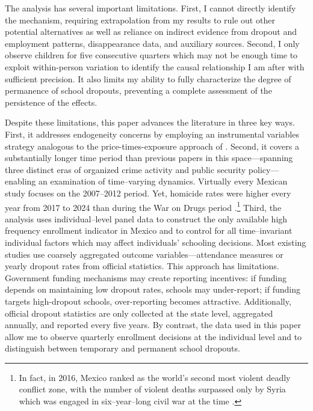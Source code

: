 \documentclass[12pt,letter,english,intoc,bibliography=totoc,index=totoc,BCOR10mm,captions=tableheading,nottitlepage,fleqn]{article}
\theoremstyle{break}
\begin{document}
The analysis has several important limitations. First, I cannot directly identify the mechanism, requiring extrapolation from my results to rule out other potential alternatives as well as reliance on indirect evidence from dropout and employment patterns, disappearance data, and auxiliary sources. Second, I only observe children for five consecutive quarters which may not be enough time to exploit within-person variation to identify the causal relationship I am after with sufficient precision. It also limits my ability to fully characterize the degree of permanence of school dropouts, preventing a complete assessment of the persistence of the effects.  

Despite these limitations, this paper advances the literature in three key ways. First, it addresses endogeneity concerns by employing an instrumental variables strategy analogous to the price-times-exposure approach of \citet{dubevargas}. Second, it covers a substantially longer time period than previous papers in this space---spanning three distinct eras of organized crime activity and public security policy---enabling an examination of time--varying dynamics. Virtually every Mexican study focuses on the 2007--2012 period. Yet, homicide rates were higher every year from 2017 to 2024 than during the War on Drugs period \citep{igarape}.\footnote{In fact, in 2016, Mexico ranked as the world's second most violent deadly conflict zone, with the number of violent deaths surpassed only by Syria which was engaged in six--year--long civil war at the time \citep{iiss2017}.} Third, the analysis uses individual--level panel data to construct the only available high frequency enrollment indicator in Mexico and to control for all time--invariant individual factors which may affect individuals' schooling decisions. Most existing studies use coarsely aggregated outcome variables---attendance measures or yearly dropout rates from official statistics. This approach has limitations. Government funding mechanisms may create reporting incentives: if funding depends on maintaining low dropout rates, schools may under-report; if funding targets high-dropout schools, over-reporting becomes attractive. Additionally, official dropout statistics are only collected at the state level, aggregated annually, and reported every five years. By contrast, the data used in this paper allow me to observe quarterly enrollment decisions at the individual level and to distinguish between temporary and permanent school dropouts. 
\end{document}
